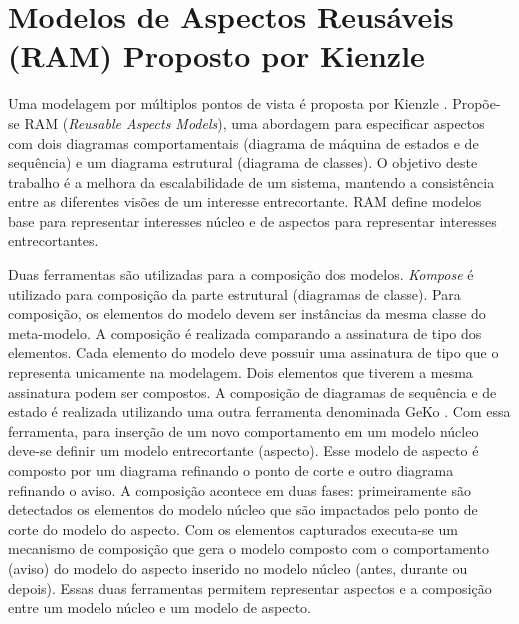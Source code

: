 \section{Modelos de Aspectos Reusáveis (RAM) Proposto por Kienzle}

Uma modelagem por múltiplos pontos de vista é proposta por Kienzle \cite{Kienzle:2009:AMM:1509239.1509252} \cite{Kienzle2010}. Propõe-se RAM
(\textit{Reusable Aspects Models}), uma abordagem para especificar aspectos com dois diagramas comportamentais (diagrama de máquina de estados e de
sequência) e um diagrama estrutural (diagrama de classes). O objetivo deste trabalho é a melhora da escalabilidade de um sistema, mantendo a consistência entre as diferentes visões de um interesse
entrecortante. RAM define modelos base para representar interesses núcleo e de aspectos para representar interesses entrecortantes.

Duas ferramentas são utilizadas para a composição dos modelos. \textit{Kompose} \cite{kompose:07} é utilizado para composição da parte estrutural
(diagramas de classe). Para composição, os elementos do modelo devem ser instâncias da mesma classe do meta-modelo. A composição é realizada
comparando a assinatura de tipo dos elementos. Cada elemento do modelo deve possuir uma assinatura de tipo que o representa unicamente na modelagem.
Dois elementos que tiverem a mesma assinatura podem ser compostos. A composição de diagramas de sequência e de estado é realizada utilizando uma outra
ferramenta denominada GeKo \cite{geko:08}. Com essa ferramenta, para inserção de um novo comportamento em um modelo núcleo deve-se definir um modelo 
entrecortante (aspecto). Esse modelo de aspecto é composto por um diagrama refinando o ponto de corte e outro diagrama refinando o aviso. A composição
acontece em duas fases: primeiramente são detectados os elementos do modelo núcleo que são impactados pelo ponto de corte do modelo do aspecto. Com os 
elementos capturados executa-se um mecanismo de composição que gera o modelo composto com o comportamento (aviso)
do modelo do aspecto inserido no modelo núcleo (antes, durante ou depois). Essas duas ferramentas permitem representar aspectos e a composição entre
um modelo núcleo e um modelo de aspecto.

